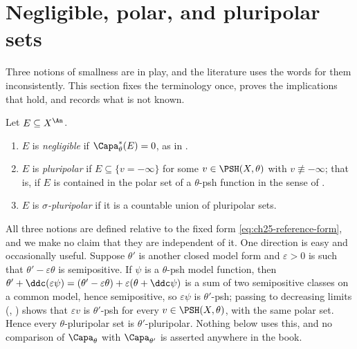 \section{Negligible, polar, and pluripolar sets}
\label{sec:ch25-negligible}

Three notions of smallness are in play, and the literature uses the words
for them inconsistently.  This section fixes the terminology once, proves the
implications that hold, and records what is not known.

\begin{definition}
\label{def:ch25-set-classes}
Let \(E\subseteq X^{\An}\).
\begin{enumerate}
\item\label{itm:ch25-cls:neg}
 \(E\) is \emph{negligible} if \(\Capa^*_\theta(E)=0\), as in
 .
\item\label{itm:ch25-cls:plp}
 \(E\) is \emph{pluripolar} if \(E\subseteq\{v=-\infty\}\) for some
 \(v\in\PSH(X,\theta)\) with \(v\not\equiv-\infty\); that is, if \(E\) is
 contained in the polar set of a \(\theta\)-psh function in the sense of
 .
\item\label{itm:ch25-cls:sig}
 \(E\) is \emph{\(\sigma\)-pluripolar} if it is a countable union of
 pluripolar sets.
\end{enumerate}
\end{definition}

\begin{remark}
\label{rem:ch25-independence-of-theta}
All three notions are defined relative to the fixed form
\eqref{eq:ch25-reference-form}, and we make no claim that they are
independent of it.  One direction is easy and occasionally useful.  Suppose
\(\theta'\) is another closed model form and \(\varepsilon>0\) is such that
\(\theta'-\varepsilon\theta\) is semipositive.  If \(\psi\) is a
\(\theta\)-psh model function, then
\(\theta'+\ddc(\varepsilon\psi)
 =(\theta'-\varepsilon\theta)+\varepsilon(\theta+\ddc\psi)\)
is a sum of two semipositive classes on a common model, hence semipositive,
so \(\varepsilon\psi\) is \(\theta'\)-psh; passing to decreasing limits
(,
) shows that \(\varepsilon v\) is
\(\theta'\)-psh for every \(v\in\PSH(X,\theta)\), with the same polar set.
Hence every \(\theta\)-pluripolar set is \(\theta'\)-pluripolar.  Nothing
below uses this, and no comparison of \(\Capa_\theta\) with
\(\Capa_{\theta'}\) is asserted anywhere in the book.
\end{remark}

